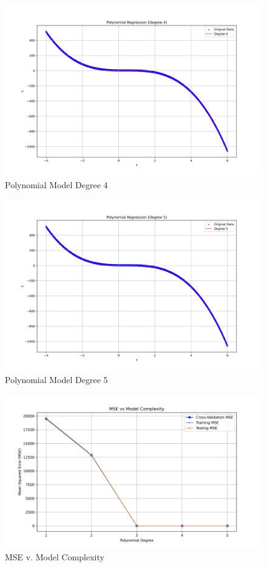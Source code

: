 \documentclass[11pt]{article}
\begin{document}
\begin{figure}[h!]
  \includegraphics[width=\textwidth]{../plots/poly_reg_deg4_fold1.png}
  \centering
  \caption{Polynomial Model Degree 4}
\end{figure}

\begin{figure}[h!]
  \includegraphics[width=\textwidth]{../plots/poly_reg_deg5_fold1.png}
  \centering
  \caption{Polynomial Model Degree 5}
\end{figure}

\begin{figure}[h!]
  \includegraphics[width=\textwidth]{../plots/mse_vs_complexity.png}
  \centering
  \caption{MSE v. Model Complexity}
\end{figure}
\end{document}
